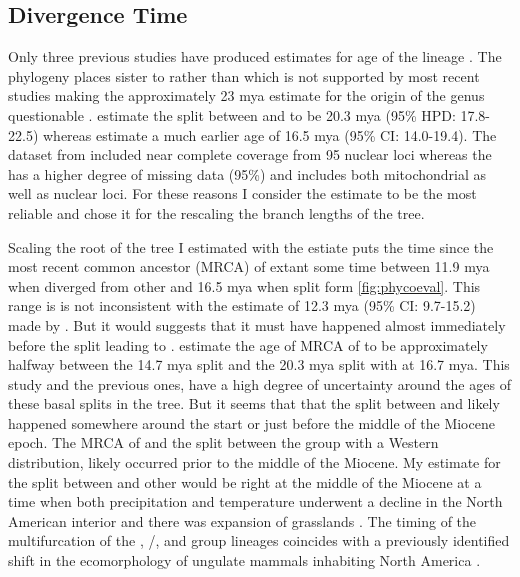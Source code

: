 \subsection{Divergence Time}
Only three previous studies have produced estimates for age of the \anaxyrus
lineage \cite{frazao2015,feng2017,portik2023}.
The \cite{frazao2015} phylogeny places \incilius sister to \rhinella rather 
than \incilius which is not supported by most recent studies making 
the approximately 23 mya estimate for the origin of the genus questionable \cite{feng2017,portik2023,pyron2011}. 
\cite{portik2023} estimate the split between \anaxyrus and \incilius to be
20.3 mya (95\% HPD: 17.8-22.5) whereas \cite{feng2017} estimate a much earlier 
age of 16.5 mya (95\% CI: 14.0-19.4).
The dataset from \cite{feng2017} included near complete coverage from 95 nuclear loci 
whereas the \cite{portik2023} has a higher degree of missing data (95\%)
and includes both mitochondrial as well as nuclear loci. 
For these reasons I consider the \cite{feng2017} estimate to be the most reliable
and chose it for the rescaling the branch lengths of the \phycoeval tree.

Scaling the root of the \phycoeval tree I estimated with the \cite{feng2017} estiate
puts the time since the most recent common ancestor (MRCA) of extant \anaxyrus 
some time between 11.9 mya when \punctatus diverged from other \anaxyrus and 16.5 mya
when \anaxyrus split form \incilius \cref{fig:phycoeval}.
This range is is not inconsistent with the estimate of 12.3 mya (95\% CI: 9.7-15.2) 
made by \cite{feng2017}.
But it would suggests that it must have happened almost immediately before the 
split leading to \punctatus. 
\cite{portik2023} estimate the age of MRCA of \anaxyrus to be approximately halfway 
between the 14.7 mya \punctatus split and the 20.3 mya split with \incilius at 16.7 mya. 
This study and the previous ones, have a high degree of uncertainty around the 
ages of these basal splits in the \anaxyrus tree. 
But it seems that that the split between \incilius and \anaxyrus likely happened 
somewhere around the start or just before the middle of the Miocene epoch.
The MRCA of \anaxyrus and the split between the \boreas group with a Western 
distribution, likely occurred prior to the middle of the Miocene. 
My estimate for the split between \punctatus and other \anaxyrus would be 
right at the middle of the Miocene at a time when both precipitation and 
temperature underwent a decline in the North American interior and there was
expansion of grasslands \parencite{morales-garcia2020}.
The timing of the multifurcation of the \quercicus, \cognatus/\speciosus, and 
\americanus group lineages coincides with a previously identified shift in the
ecomorphology of ungulate mammals inhabiting North America \parencite{morales-garcia2020}. 

